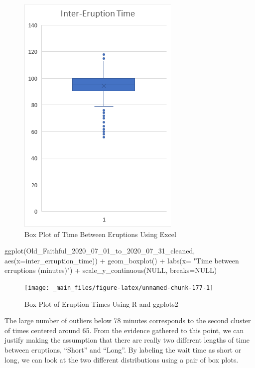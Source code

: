 \documentclass[
]{book}
\newenvironment{Shaded}{\begin{snugshade}}{\end{snugshade}}
\newcommand{\AttributeTok}[1]{\textcolor[rgb]{0.77,0.63,0.00}{#1}}
\newcommand{\ConstantTok}[1]{\textcolor[rgb]{0.00,0.00,0.00}{#1}}
\newcommand{\FunctionTok}[1]{\textcolor[rgb]{0.00,0.00,0.00}{#1}}
\newcommand{\NormalTok}[1]{#1}
\newcommand{\SpecialCharTok}[1]{\textcolor[rgb]{0.00,0.00,0.00}{#1}}
\newcommand{\StringTok}[1]{\textcolor[rgb]{0.31,0.60,0.02}{#1}}
\theoremstyle{definition}
\theoremstyle{definition}
\theoremstyle{definition}
\theoremstyle{definition}
\theoremstyle{remark}
\begin{document}
\begin{figure}

{\centering \includegraphics[width=0.3\linewidth]{data-examples/Old-Faithful/Eruption-Box-Excel} 

}

\caption{Box Plot of Time Between Eruptions Using Excel}\label{fig:unnamed-chunk-176}
\end{figure}

\begin{Shaded}
\begin{Highlighting}[]
\FunctionTok{ggplot}\NormalTok{(Old\_Faithful\_2020\_07\_01\_to\_2020\_07\_31\_cleaned, }\FunctionTok{aes}\NormalTok{(}\AttributeTok{x=}\NormalTok{inter\_erruption\_time)) }\SpecialCharTok{+} \FunctionTok{geom\_boxplot}\NormalTok{() }\SpecialCharTok{+} \FunctionTok{labs}\NormalTok{(}\AttributeTok{x=} \StringTok{"Time between erruptions (minutes)"}\NormalTok{) }\SpecialCharTok{+} \FunctionTok{scale\_y\_continuous}\NormalTok{(}\ConstantTok{NULL}\NormalTok{, }\AttributeTok{breaks=}\ConstantTok{NULL}\NormalTok{)}
\end{Highlighting}
\end{Shaded}

\begin{figure}

{\centering \texttt{[image: \_main\_files/figure-latex/unnamed-chunk-177-1]} 

}

\caption{Box Plot of Eruption Times Using R and ggplots2}\label{fig:unnamed-chunk-177}
\end{figure}

The large number of outliers below 78 minutes corresponds to the second cluster of times centered around 65. From the evidence gathered to this point, we can justify making the assumption that there are really two different lengths of time between eruptions, ``Short'' and ``Long''. By labeling the wait time as short or long, we can look at the two different distributions using a pair of box plots.
\end{document}
